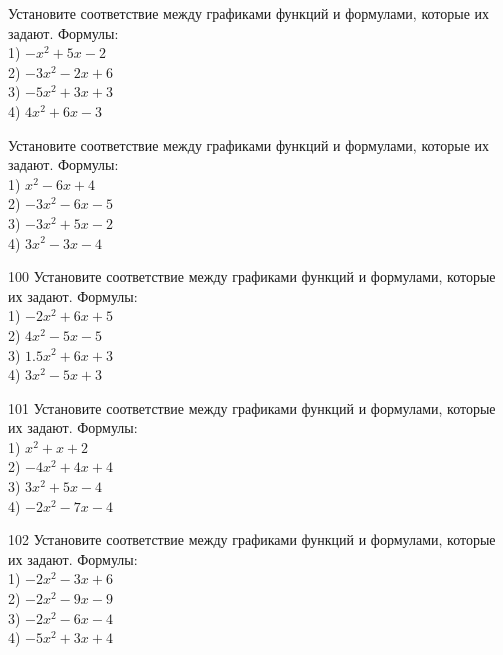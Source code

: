 \documentclass[4apaper]{article}
\begin{document}
\begin{taskBN}{98}
Установите соответствие между графиками функций и формулами, которые их задают. Формулы: \\1) $-x^2+5x-2$\\2) $-3x^2-2x+6$\\3) $-5x^2+3x+3$\\4) $4x^2+6x-3$
\end{taskBN}

\begin{taskBN}{99}
Установите соответствие между графиками функций и формулами, которые их задают. Формулы: \\1) $x^2-6x+4$\\2) $-3x^2-6x-5$\\3) $-3x^2+5x-2$\\4) $3x^2-3x-4$
\end{taskBN}

\begin{taskBN}{100}
Установите соответствие между графиками функций и формулами, которые их задают. Формулы: \\1) $-2x^2+6x+5$\\2) $4x^2-5x-5$\\3) $1.5x^2+6x+3$\\4) $3x^2-5x+3$
\end{taskBN}

\begin{taskBN}{101}
Установите соответствие между графиками функций и формулами, которые их задают. Формулы: \\1) $x^2+x+2$\\2) $-4x^2+4x+4$\\3) $3x^2+5x-4$\\4) $-2x^2-7x-4$
\end{taskBN}

\begin{taskBN}{102}
Установите соответствие между графиками функций и формулами, которые их задают. Формулы: \\1) $-2x^2-3x+6$\\2) $-2x^2-9x-9$\\3) $-2x^2-6x-4$\\4) $-5x^2+3x+4$
\end{taskBN}
\end{document}
